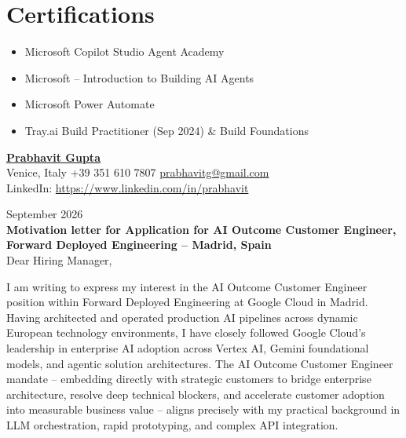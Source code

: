 \documentclass[10pt,a4paper]{article}
\begin{document}
\section*{Certifications}
\begin{itemize}
    \item Microsoft Copilot Studio Agent Academy
    \item Microsoft -- Introduction to Building AI Agents
    \item Microsoft Power Automate
    \item Tray.ai Build Practitioner (Sep 2024) \& Build Foundations
\end{itemize}


\clearpage

\begin{flushleft}
    {\large \textbf{\underline{Prabhavit Gupta}}}\\[2pt]
    Venice, Italy \textbar{} +39 351 610 7807 \textbar{} \href{mailto:prabhavitg@gmail.com}{prabhavitg@gmail.com}\\
    LinkedIn: \href{https://www.linkedin.com/in/prabhavit}{https://www.linkedin.com/in/prabhavit}
\end{flushleft}

\vspace{8pt}
 September 2026\\[8pt]
\noindent\textbf{Motivation letter for Application for AI Outcome Customer Engineer, Forward Deployed Engineering -- Madrid, Spain}\\[8pt]
\noindent Dear Hiring Manager,

\vspace{6pt}
I am writing to express my interest in the AI Outcome Customer Engineer position within Forward Deployed Engineering at Google Cloud in Madrid. Having architected and operated production AI pipelines across dynamic European technology environments, I have closely followed Google Cloud's leadership in enterprise AI adoption across Vertex AI, Gemini foundational models, and agentic solution architectures. The AI Outcome Customer Engineer mandate -- embedding directly with strategic customers to bridge enterprise architecture, resolve deep technical blockers, and accelerate customer adoption into measurable business value -- aligns precisely with my practical background in LLM orchestration, rapid prototyping, and complex API integration.
\end{document}
